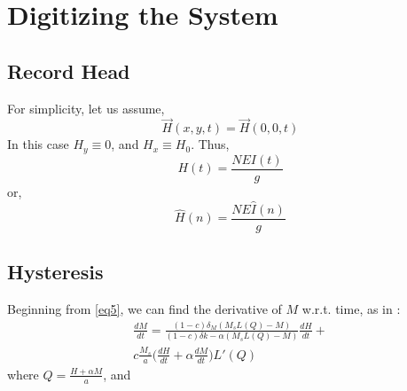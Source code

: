 \documentclass[twoside,a4paper]{article}
\begin{document}
\section{Digitizing the System}
\subsection{Record Head}
For simplicity, let us assume,
\begin{equation}
    \vec{H}(x,y,t) = \vec{H}(0,0,t)
\end{equation}
%
In this case $H_y \equiv 0$, and $H_x \equiv H_0$. Thus,
\begin{equation}
    H(t) = \frac{NEI(t)}{g}
    \label{eq15}
\end{equation}
%
or,
\begin{equation}
    \hat{H}(n) = \frac{NE\hat{I}(n)}{g}
\end{equation}

\subsection{Hysteresis}
Beginning from \cref{eq5}, we can find the derivative of $M$ w.r.t. time,
as in \cite{Hysteresis}:
\begin{multline}
    \frac{dM}{dt} = \frac{(1-c) \delta_M (M_sL(Q) - M)}{(1-c) \delta k - \alpha (M_sL(Q) - M)} \frac{dH}{dt} + \\
     c \frac{M_s}{a} \Big(\frac{dH}{dt} + \alpha \frac{dM}{dt} \Big) L'(Q)
\end{multline}
%
where $Q = \frac{H + \alpha M}{a}$, and
\end{document}

